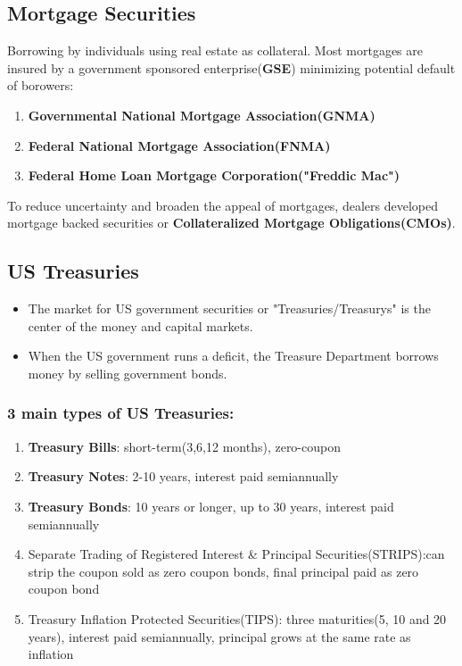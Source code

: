 \documentclass{article}
\theoremstyle{definition}
\theoremstyle{thrm}
\theoremstyle{lma}
\theoremstyle{ppst}
\theoremstyle{crlr}
\begin{document}
\subsection{Mortgage Securities}
Borrowing by individuals using real estate as collateral. Most mortgages are insured by a government sponsored enterprise(\textbf{GSE}) minimizing potential default of borowers:
\begin{enumerate}
	\item \textbf{Governmental National Mortgage Association(GNMA)}
	\item \textbf{Federal National Mortgage Association(FNMA)}
	\item \textbf{Federal Home Loan Mortgage Corporation("Freddic Mac")}
\end{enumerate}
To reduce uncertainty and broaden the appeal of mortgages, dealers developed mortgage backed securities or \textbf{Collateralized Mortgage Obligations(CMOs)}. 

\subsection{US Treasuries}
\begin{itemize}
	\item The market for US government securities or "Treasuries/Treasurys" is the center of the money and capital markets.
	\item When the US government runs a deficit, the Treasure Department borrows money by selling government bonds. 
\end{itemize}
\subsubsection{3 main types of US Treasuries:}
\begin{enumerate}
	\item \textbf{Treasury Bills}: short-term(3,6,12 months), zero-coupon
	\item \textbf{Treasury Notes}: 2-10 years, interest paid semiannually
	\item \textbf{Treasury Bonds}: 10 years or longer, up to 30 years, interest paid semiannually
	\item Separate Trading of Registered Interest \& Principal Securities(STRIPS):can strip the coupon sold as zero coupon bonds, final principal paid as zero coupon bond
	\item Treasury Inflation Protected Securities(TIPS): three maturities(5, 10 and 20 years), interest paid semiannually, principal grows at the same rate as inflation
\end{enumerate}
\end{document}
